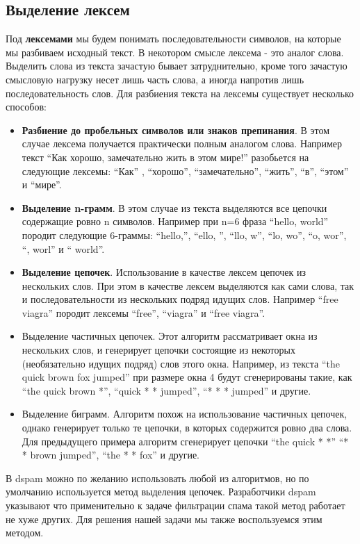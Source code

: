 \subsection{Выделение лексем}
Под \textbf{лексемами} мы будем понимать последовательности символов, на которые мы разбиваем исходный текст. В некотором смысле лексема - это аналог слова. Выделить слова из текста зачастую бывает затруднительно, кроме того зачастую смысловую нагрузку несет лишь часть слова, а иногда напротив лишь последовательность слов. Для разбиения текста на лексемы существует несколько способов:
\begin{itemize}
\item \textbf{Разбиение до пробельных символов или знаков препинания}. В этом случае лексема получается практически полным аналогом слова. Например текст ``Как хорошо, замечательно жить в этом мире!'' разобьется на следующие лексемы:
 ``Как'' , ``хорошо'', ``замечательно'', ``жить'', ``в'', ``этом'' и ``мире''.

 \item \textbf{Выделение n-грамм}. В этом случае из текста выделяются все цепочки содержащие ровно n символов. Например при n=6 фраза ``hello, world'' породит следующие 6-граммы: ``hello,'', ``ello, '', ``llo, w'', ``lo, wo'', ``o, wor'', ``, worl'' и `` world''.

 \item \textbf{Выделение цепочек}. Использование в качестве лексем цепочек из нескольких слов. При этом в качестве лексем выделяются как сами слова, так и последовательности из нескольких подряд идущих слов. Например ``free viagra'' породит лексемы ``free'', ``viagra'' и ``free viagra''.
\item {Выделение частичных цепочек}. Этот алгоритм рассматривает окна из нескольких слов, и генерирует цепочки состоящие из некоторых (необязательно идущих подряд) слов этого окна. Например, из  текста ``the quick brown fox jumped'' при размере окна 4 будут сгенерированы такие, как ``the quick brown *'', ``quick * * jumped'', ``* * * jumped'' и другие.

\item {Выделение биграмм}. Алгоритм похож на использование частичных цепочек, однако генерирует только те цепочки, в которых содержится ровно два слова. Для предыдущего примера алгоритм сгенерирует цепочки ``the quick * *'' ``* * brown jumped'', ``the * * fox''  и другие.
\end{itemize}

В dspam можно по желанию использовать любой из алгоритмов, но по умолчанию используется метод выделения цепочек. Разработчики dspam указывают\cite{TOKS} что применительно к задаче фильтрации спама такой метод работает не хуже других. Для решения нашей задачи мы также воспользуемся этим методом.


